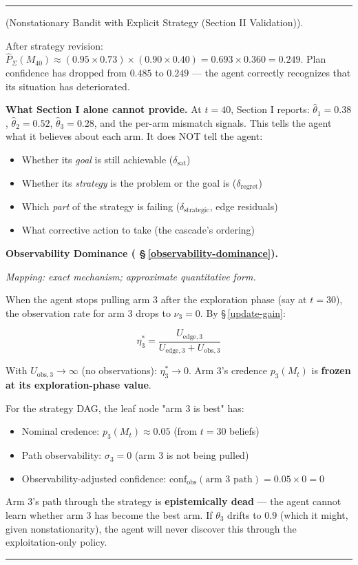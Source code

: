 \documentclass[11pt,oneside]{article}
\newcounter{claim}[section]
\renewcommand{\theclaim}{\thesection.\arabic{claim}}
\newenvironment{segment}[2]{%
  \refstepcounter{claim}%
  \bigskip\noindent\hrule\smallskip
  \noindent{\bfseries #1~\theclaim}\enskip(#2).\par\smallskip
  \noindent\ignorespaces
}{%
  \par\smallskip\noindent\hrule\bigskip
}
\newenvironment{remark}[1][]{\begin{segment}{Remark}{#1}}{\end{segment}}
\begin{document}
\begin{remark}[Nonstationary Bandit with Explicit Strategy (Section II Validation)]
After strategy revision: $\hat P_\Sigma(M_{40}) \approx (0.95 \times 0.73) \times (0.90 \times 0.40) = 0.693 \times 0.360 = 0.249$. Plan confidence has dropped from $0.485$ to $0.249$ — the agent correctly recognizes that its situation has deteriorated.

\textbf{What Section I alone cannot provide.} At $t = 40$, Section I reports: $\hat\theta_1 = 0.38$, $\hat\theta_2 = 0.52$, $\hat\theta_3 = 0.28$, and the per-arm mismatch signals. This tells the agent what it believes about each arm. It does NOT tell the agent:
\begin{itemize}
  \item Whether its \textit{goal} is still achievable ($\delta_\text{sat}$)
  \item Whether its \textit{strategy} is the problem or the goal is ($\delta_\text{regret}$)
  \item Which \textit{part} of the strategy is failing ($\delta_\text{strategic}$, edge residuals)
  \item What corrective action to take (the cascade's ordering)
\end{itemize}



\medskip\noindent\textbf{Observability Dominance ( \S\,\ref{observability-dominance}).}


\textit{Mapping: exact mechanism; approximate quantitative form.}

When the agent stops pulling arm 3 after the exploration phase (say at $t = 30$), the observation rate for arm 3 drops to $\nu_3 = 0$. By \S\,\ref{update-gain}:

$$\eta_3^* = \frac{U_{\text{edge},3}}{U_{\text{edge},3} + U_{\text{obs},3}}$$

With $U_{\text{obs},3} \to \infty$ (no observations): $\eta_3^* \to 0$. Arm 3's credence $p_3(M_t)$ is \textbf{frozen at its exploration-phase value}.

For the strategy DAG, the leaf node "arm 3 is best" has:
\begin{itemize}
  \item Nominal credence: $p_3(M_t) \approx 0.05$ (from $t = 30$ beliefs)
  \item Path observability: $\sigma_3 = 0$ (arm 3 is not being pulled)
  \item Observability-adjusted confidence: $\text{conf}_\text{obs}(\text{arm 3 path}) = 0.05 \times 0 = 0$
\end{itemize}


Arm 3's path through the strategy is \textbf{epistemically dead} — the agent cannot learn whether arm 3 has become the best arm. If $\theta_3$ drifts to $0.9$ (which it might, given nonstationarity), the agent will never discover this through the exploitation-only policy.


\end{remark}
\end{document}

